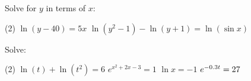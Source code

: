 \documentclass[mathNotesPreamble]{subfiles}
\begin{document}
  \begin{ex*}
    Solve for $y$ in terms of $x$:
    \begin{extasks}(2)
      \task $\ln(y-40)=5x$
      \task $\ln(y^2-1)-\ln(y+1)=\ln(\sin x)$
    \end{extasks}
  \end{ex*}
  \vfill
  \begin{ex*}
    Solve:
    \begin{tasks}[after-item-skip=\stretch{1}](2)
      \task[] $\ln(t)+\ln(t^2)=6$
      \task[] $e^{x^2+2x-3}=1$
      \task[] $\ln x=-1$
      \task[] $e\inv[0.3t]=27$
    \end{tasks}
  \end{ex*}
  \pagebreak
\end{document}
